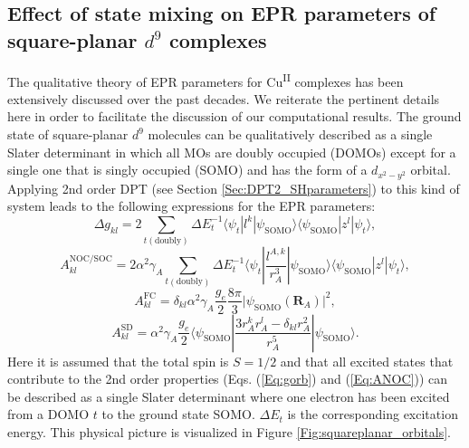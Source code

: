\subsection{Effect of state mixing on EPR parameters of square-planar $d^9$ complexes}
The qualitative theory of EPR parameters for Cu\textsuperscript{II} complexes has been extensively discussed over the past decades.\cite{Smith_1970_3108, ChowCW_1973_2629, ArambM_1985_6071, NeeseS_2003_345, MakiM_1958_31} We reiterate the pertinent details here in order to facilitate the discussion of our computational results.
The ground state of square-planar $d^9$ molecules can be qualitatively described as a single Slater determinant in which all MOs are doubly occupied (DOMOs) except for a single one that is singly occupied (SOMO) and has the form of a ${d_{{x^2} - {y^2}}}$ orbital. Applying 2nd order DPT\cite{NeeseS_2003_345} (see Section \ref{Sec:DPT2_SHparameters}) to this kind of system leads to the following expressions for the EPR parameters:
	\begin{equation}
	\label{Eq:gorb}
	\Delta {g_{kl}} = 2\sum\limits_{t({\text{doubly}})} {\Delta E_t^{ - 1}\langle {\psi _t}|{l^k}|{\psi _{{\text{SOMO}}}}\rangle \langle {\psi _{{\text{SOMO}}}}|{z^l}|{\psi _t}\rangle }, 
	\end{equation}
	\begin{equation}
	\label{Eq:ANOC}
	A_{kl}^{{\text{NOC/SOC}}} = 2{\alpha ^2}{\gamma _A}\sum\limits_{t({\text{doubly}})} \Delta  E_t^{ - 1}\langle {\psi _t}|\frac{{{l^{A,k}}}}{{r_A^3}}|{\psi _{{\text{SOMO}}}}\rangle \langle {\psi _{{\text{SOMO}}}}|{z^l}|{\psi _t}\rangle, 
	\end{equation}
	\begin{equation}
	\label{Eq:AFC}
	A_{kl}^{{\text{FC}}} = {\delta _{kl}}{\alpha ^2}{\gamma _A}\frac{{{g_e}}}{2}\frac{{8\pi }}{3}|{\psi _{{\text{SOMO}}}}({{\mathbf{R}}_A}){|^2},
	\end{equation}
	\begin{equation}
	\label{Eq:ASD}
	A_{kl}^{{\text{SD}}} = {\alpha ^2}{\gamma _A}\frac{{{g_e}}}{2}\langle {\psi _{{\text{SOMO}}}}|\frac{{3r_A^kr_A^l - {\delta _{kl}}r_A^2}}{{r_A^5}}|{\psi _{{\text{SOMO}}}}\rangle. 
	\end{equation}
Here it is assumed that the total spin is $S = 1/2$ and that all excited states that contribute to the 2nd order properties (Eqs. (\ref{Eq:gorb}) and (\ref{Eq:ANOC})) can be described as a single Slater determinant where one electron has been excited from a DOMO $t$ to the ground state SOMO. $\Delta {E_t}$ is the corresponding excitation energy. This physical picture is visualized in Figure \ref{Fig:squareplanar_orbitals}.

